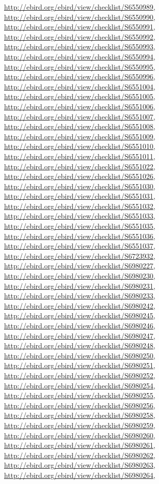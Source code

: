 \documentclass[9pt, article]{memoir}
\begin{document}
\begin{multicols}{2}
\url{http://ebird.org/ebird/view/checklist/S6550989}, 
\url{http://ebird.org/ebird/view/checklist/S6550990}, 
\url{http://ebird.org/ebird/view/checklist/S6550991}, 
\url{http://ebird.org/ebird/view/checklist/S6550992}, 
\url{http://ebird.org/ebird/view/checklist/S6550993}, 
\url{http://ebird.org/ebird/view/checklist/S6550994}, 
\url{http://ebird.org/ebird/view/checklist/S6550995}, 
\url{http://ebird.org/ebird/view/checklist/S6550996}, 
\url{http://ebird.org/ebird/view/checklist/S6551004}, 
\url{http://ebird.org/ebird/view/checklist/S6551005}, 
\url{http://ebird.org/ebird/view/checklist/S6551006}, 
\url{http://ebird.org/ebird/view/checklist/S6551007}, 
\url{http://ebird.org/ebird/view/checklist/S6551008}, 
\url{http://ebird.org/ebird/view/checklist/S6551009}, 
\url{http://ebird.org/ebird/view/checklist/S6551010}, 
\url{http://ebird.org/ebird/view/checklist/S6551011}, 
\url{http://ebird.org/ebird/view/checklist/S6551022}, 
\url{http://ebird.org/ebird/view/checklist/S6551026}, 
\url{http://ebird.org/ebird/view/checklist/S6551030}, 
\url{http://ebird.org/ebird/view/checklist/S6551031}, 
\url{http://ebird.org/ebird/view/checklist/S6551032}, 
\url{http://ebird.org/ebird/view/checklist/S6551033}, 
\url{http://ebird.org/ebird/view/checklist/S6551035}, 
\url{http://ebird.org/ebird/view/checklist/S6551036}, 
\url{http://ebird.org/ebird/view/checklist/S6551037}, 
\url{http://ebird.org/ebird/view/checklist/S6723932}, 
\url{http://ebird.org/ebird/view/checklist/S6980227}, 
\url{http://ebird.org/ebird/view/checklist/S6980230}, 
\url{http://ebird.org/ebird/view/checklist/S6980231}, 
\url{http://ebird.org/ebird/view/checklist/S6980233}, 
\url{http://ebird.org/ebird/view/checklist/S6980242}, 
\url{http://ebird.org/ebird/view/checklist/S6980245}, 
\url{http://ebird.org/ebird/view/checklist/S6980246}, 
\url{http://ebird.org/ebird/view/checklist/S6980247}, 
\url{http://ebird.org/ebird/view/checklist/S6980248}, 
\url{http://ebird.org/ebird/view/checklist/S6980250}, 
\url{http://ebird.org/ebird/view/checklist/S6980251}, 
\url{http://ebird.org/ebird/view/checklist/S6980252}, 
\url{http://ebird.org/ebird/view/checklist/S6980254}, 
\url{http://ebird.org/ebird/view/checklist/S6980255}, 
\url{http://ebird.org/ebird/view/checklist/S6980256}, 
\url{http://ebird.org/ebird/view/checklist/S6980258}, 
\url{http://ebird.org/ebird/view/checklist/S6980259}, 
\url{http://ebird.org/ebird/view/checklist/S6980260}, 
\url{http://ebird.org/ebird/view/checklist/S6980261}, 
\url{http://ebird.org/ebird/view/checklist/S6980262}, 
\url{http://ebird.org/ebird/view/checklist/S6980263}, 
\url{http://ebird.org/ebird/view/checklist/S6980264}, 

\end{multicols}
\end{document}
